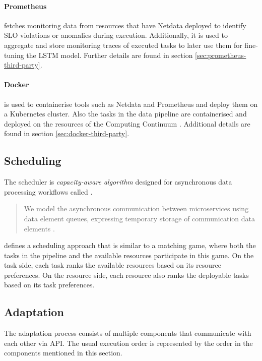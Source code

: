       \paragraph{Prometheus} fetches monitoring data from resources that have Netdata deployed to identify SLO violations or anomalies during execution. Additionally, it is used to aggregate and store monitoring traces of executed tasks to later use them for fine-tuning the LSTM model.
      Further details are found in section \ref{sec:prometheus-third-party}.

      \paragraph{Docker} is used to containerise tools such as Netdata and Prometheus and deploy them on a Kubernetes cluster. Also the tasks in the data pipeline are containerised and deployed on the resources of the Computing Continuum \cite{kimovskiBigDataPipeline2022}.
      Additional details are found in section \ref{sec:docker-third-party}.


    \subsection{Scheduling}
    \label{sec:scheduling-saa-background}

      The scheduler is \emph{capacity-aware algorithm} designed for asynchronous data processing workflows called \CMATCH.

      \begin{quote}
          We model the asynchronous communication between microservices using data element queues, expressing temporary storage of communication data elements \cite{mehranMatchingbasedSchedulingAsynchronous2022}.
      \end{quote} 
      \CMATCH defines a scheduling approach that is similar to a matching game, where both the tasks in the pipeline and the available resources participate in this game.
      On the task side, each task ranks the available resources based on its resource preferences.
      On the resource side, each resource also ranks the deployable tasks based on its task preferences.

    \subsection{Adaptation}
    \label{sec:adaptation-saa-background}

        The adaptation process consists of multiple components that communicate with each other via API.
        The usual execution order is represented by the order in the components mentioned in this section.
        

